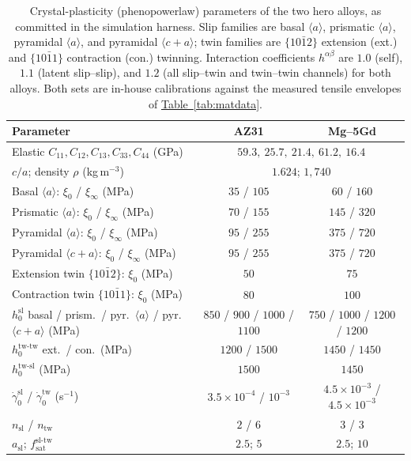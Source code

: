 \documentclass[preprint,12pt]{elsarticle}
\newcommand{\tabref}[1]{\hyperref[#1]{Table~\ref*{#1}}}
\begin{document}
\begin{table}[!t]
\centering
\caption{Crystal-plasticity (phenopowerlaw) parameters of the two hero alloys, as committed in the simulation harness. Slip families are basal $\langle a\rangle$, prismatic $\langle a\rangle$, pyramidal $\langle a\rangle$, and pyramidal $\langle c{+}a\rangle$; twin families are $\{10\bar{1}2\}$ extension (ext.) and $\{10\bar{1}1\}$ contraction (con.) twinning. Interaction coefficients $h^{\alpha\beta}$ are $1.0$ (self), $1.1$ (latent slip--slip), and $1.2$ (all slip--twin and twin--twin channels) for both alloys. Both sets are in-house calibrations against the measured tensile envelopes of \tabref{tab:matdata}.}
\label{tab:cp}
\renewcommand{\arraystretch}{1.15}
\begin{tabular}{l c c}
\toprule
Parameter & AZ31 & Mg--5Gd \\
\midrule
Elastic $C_{11}, C_{12}, C_{13}, C_{33}, C_{44}$ (GPa) & \multicolumn{2}{c}{$59.3,\ 25.7,\ 21.4,\ 61.2,\ 16.4$} \\
$c/a$; density $\rho$ (kg\,m$^{-3}$) & \multicolumn{2}{c}{$1.624$; $1{,}740$} \\
\midrule
Basal $\langle a\rangle$: $\xi_0$ / $\xi_\infty$ (MPa) & $35$ / $105$ & $60$ / $160$ \\
Prismatic $\langle a\rangle$: $\xi_0$ / $\xi_\infty$ (MPa) & $70$ / $155$ & $145$ / $320$ \\
Pyramidal $\langle a\rangle$: $\xi_0$ / $\xi_\infty$ (MPa) & $95$ / $255$ & $375$ / $720$ \\
Pyramidal $\langle c{+}a\rangle$: $\xi_0$ / $\xi_\infty$ (MPa) & $95$ / $255$ & $375$ / $720$ \\
Extension twin $\{10\bar{1}2\}$: $\xi_0$ (MPa) & $50$ & $75$ \\
Contraction twin $\{10\bar{1}1\}$: $\xi_0$ (MPa) & $80$ & $100$ \\
\midrule
$h_0^{\mathrm{sl}}$ basal / prism.\ / pyr.\ $\langle a\rangle$ / pyr.\ $\langle c{+}a\rangle$ (MPa) & $850$ / $900$ / $1000$ / $1100$ & $750$ / $1000$ / $1200$ / $1200$ \\
$h_0^{\mathrm{tw\text{-}tw}}$ ext.\ / con.\ (MPa) & $1200$ / $1500$ & $1450$ / $1450$ \\
$h_0^{\mathrm{tw\text{-}sl}}$ (MPa) & $1500$ & $1450$ \\
$\dot\gamma_0^{\mathrm{sl}}$ / $\dot\gamma_0^{\mathrm{tw}}$ (s$^{-1}$) & $3.5\times10^{-4}$ / $10^{-3}$ & $4.5\times10^{-3}$ / $4.5\times10^{-3}$ \\
$n_{\mathrm{sl}}$ / $n_{\mathrm{tw}}$ & $2$ / $6$ & $3$ / $3$ \\
$a_{\mathrm{sl}}$; $f_{\mathrm{sat}}^{\mathrm{sl\text{-}tw}}$ & $2.5$; $5$ & $2.5$; $10$ \\
\bottomrule
\end{tabular}
\end{table}
\end{document}
